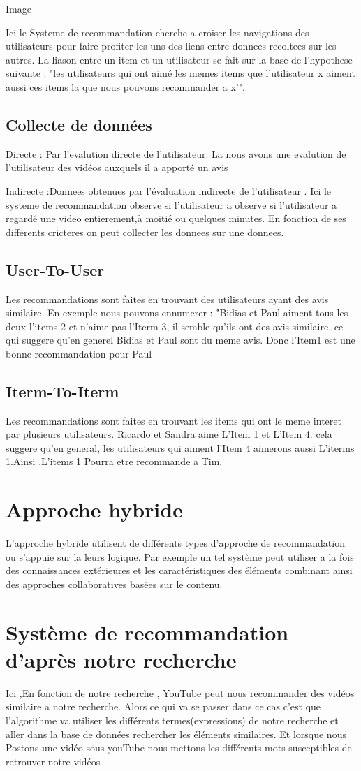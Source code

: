 \documentclass[12pt,a4paper]{article}
\begin{document}
Image

 Ici le Systeme de recommandation cherche a croiser les navigations des utilisateurs pour faire profiter les uns des liens entre donnees recoltees sur les autres. La liason entre un item et un utilisateur se fait sur la base de l'hypothese suivante : "les utilisateurs qui ont aimé les memes items que l'utilisateur x aiment aussi ces items la que nous pouvons recommander a x'".
 
 \subsection{Collecte de données}
 Directe : Par l'evalution directe de l'utilisateur. La nous avons une evalution de l'utilisateur des vidéos auxquels il a apporté un avis
 
Indirecte :Donnees obtenues par l'évaluation indirecte de l'utilisateur . Ici le systeme de recommandation observe si l'utilisateur a observe si l'utilisateur a regardé une video entierement,à moitié ou quelques minutes. En fonction de ses differents cricteres on peut collecter les donnees sur une donnees.

\subsection{User-To-User}
Les recommandations sont faites en trouvant des utilisateurs ayant des avis similaire. En exemple nous pouvons ennumerer : "Bidias et Paul aiment tous les deux l'items 2 et n'aime pas l'Iterm 3, il semble qu'ils ont des avis similaire, ce qui suggere qu'en generel Bidias et Paul sont du meme avis. Donc l'Item1 est une bonne recommandation pour Paul
\subsection{Iterm-To-Iterm}
Les recommandations sont faites en trouvant les items qui ont le meme interet par plusieurs utilisateurs. Ricardo et Sandra aime L'Item 1 et L'Item 4. cela suggere qu'en general, les utilisateurs qui aiment l'Item 4 aimerons aussi L'iterms 1.Ainsi ,L'items 1 Pourra etre recommande a Tim. 
\section{Approche hybride}
L'approche hybride utilisent de différents types d'approche de recommandation ou s'appuie sur la leurs logique. Par exemple un tel système peut utiliser a la fois des connaissances extérieures et les caractéristiques des éléments combinant ainsi des approches collaboratives basées sur le contenu.	
\section{Système de recommandation d'après notre recherche}
Ici ,En fonction de notre recherche , YouTube peut nous recommander des vidéos similaire a notre
recherche. Alors ce qui va se passer dans ce cas c'est que l'algorithme va utiliser les différents termes(expressions) de notre recherche et aller
dans la base de données rechercher les éléments similaires. Et lorsque nous Postons une vidéo sous youTube nous mettons les différents mots 
susceptibles de retrouver notre vidéos 
\end{document}
